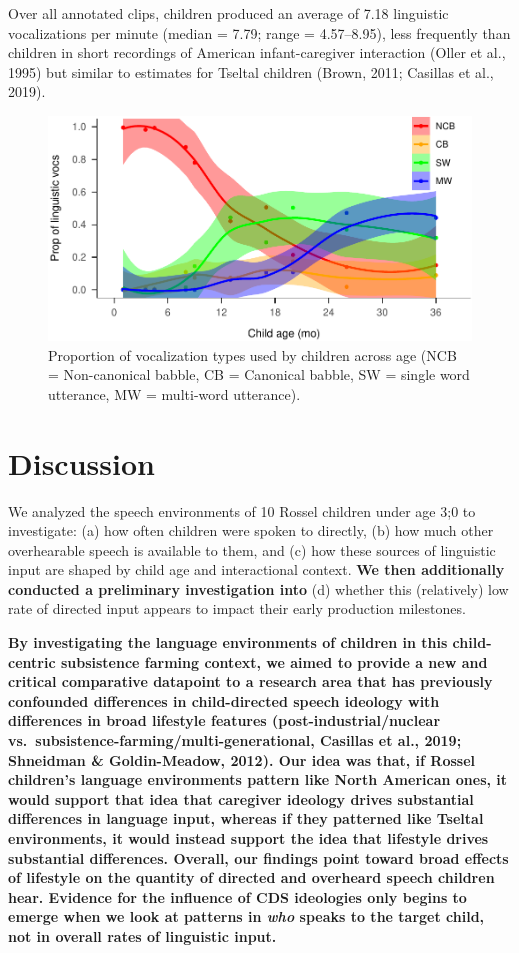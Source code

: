 \documentclass[,man,floatsintext]{apa6}
\begin{document}
Over all annotated clips, children produced an average of 7.18
linguistic vocalizations per minute (median = 7.79; range = 4.57--8.95),
less frequently than children in short recordings of American
infant-caregiver interaction (Oller et al., 1995) but similar to
estimates for Tseltal children (Brown, 2011; Casillas et al., 2019).

\begin{figure}
\centering
\includegraphics{Yeli-CLE_files/figure-latex/fig4-1.pdf}
\caption{\label{fig:fig4}Proportion of vocalization types used by children
across age (NCB = Non-canonical babble, CB = Canonical babble, SW =
single word utterance, MW = multi-word utterance).}
\end{figure}

\section{Discussion}\label{disc}

We analyzed the speech environments of 10 Rossel children under age 3;0
to investigate: (a) how often children were spoken to directly, (b) how
much other overhearable speech is available to them, and (c) how these
sources of linguistic input are shaped by child age and interactional
context. \textbf{We then additionally conducted a preliminary
investigation into} (d) whether this (relatively) low rate of directed
input appears to impact their early production milestones.

\textbf{By investigating the language environments of children in this
child-centric subsistence farming context, we aimed to provide a new and
critical comparative datapoint to a research area that has previously
confounded differences in child-directed speech ideology with
differences in broad lifestyle features (post-industrial/nuclear
vs.~subsistence-farming/multi-generational, Casillas et al., 2019;
Shneidman \& Goldin-Meadow, 2012). Our idea was that, if Rossel
children's language environments pattern like North American ones, it
would support that idea that caregiver ideology drives substantial
differences in language input, whereas if they patterned like Tseltal
environments, it would instead support the idea that lifestyle drives
substantial differences. Overall, our findings point toward broad
effects of lifestyle on the quantity of directed and overheard speech
children hear. Evidence for the influence of CDS ideologies only begins
to emerge when we look at patterns in \emph{who} speaks to the target
child, not in overall rates of linguistic input.}
\end{document}
